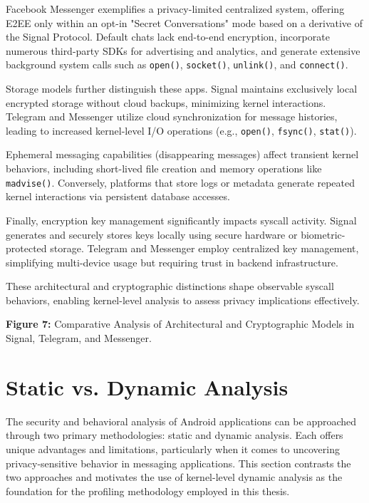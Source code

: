 \documentclass[a4paper,12pt]{report}
\begin{document}
Facebook Messenger exemplifies a privacy-limited centralized system, offering E2EE only within an opt-in "Secret Conversations" mode based on a derivative of the Signal Protocol. Default chats lack end-to-end encryption, incorporate numerous third-party SDKs for advertising and analytics, and generate extensive background system calls such as \texttt{open()}, \texttt{socket()}, \texttt{unlink()}, and \texttt{connect()}.

Storage models further distinguish these apps. Signal maintains exclusively local encrypted storage without cloud backups, minimizing kernel interactions. Telegram and Messenger utilize cloud synchronization for message histories, leading to increased kernel-level I/O operations (e.g., \texttt{open()}, \texttt{fsync()}, \texttt{stat()}).

Ephemeral messaging capabilities (disappearing messages) affect transient kernel behaviors, including short-lived file creation and memory operations like \texttt{madvise()}. Conversely, platforms that store logs or metadata generate repeated kernel interactions via persistent database accesses.

Finally, encryption key management significantly impacts syscall activity. Signal generates and securely stores keys locally using secure hardware or biometric-protected storage. Telegram and Messenger employ centralized key management, simplifying multi-device usage but requiring trust in backend infrastructure.

These architectural and cryptographic distinctions shape observable syscall behaviors, enabling kernel-level analysis to assess privacy implications effectively.

\textbf{Figure 7:} Comparative Analysis of Architectural and Cryptographic Models in Signal, Telegram, and Messenger.


\section{Static vs. Dynamic Analysis}

The security and behavioral analysis of Android applications can be approached through two primary methodologies: static and dynamic analysis. Each offers unique advantages and limitations, particularly when it comes to uncovering privacy-sensitive behavior in messaging applications. This section contrasts the two approaches and motivates the use of kernel-level dynamic analysis as the foundation for the profiling methodology employed in this thesis.
\end{document}
